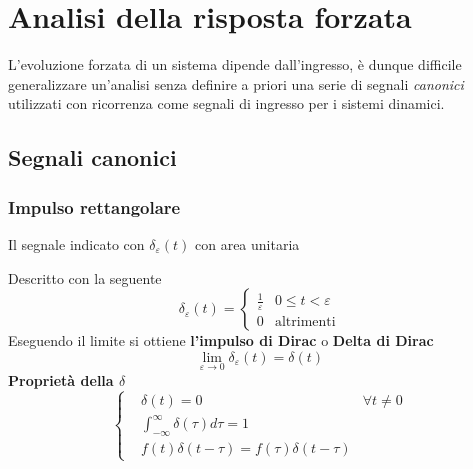 \newpage
\section{Analisi della risposta forzata}
L'evoluzione forzata di un sistema dipende dall'ingresso, è dunque difficile
generalizzare un'analisi senza definire a priori una serie di segnali
\textit{canonici} utilizzati con ricorrenza come segnali di ingresso per i
sistemi dinamici.

\subsection{Segnali canonici}
\label{sec:segnali_canonici}
\subsubsection{Impulso rettangolare}
Il segnale indicato con $\delta_\varepsilon(t)$ con area unitaria
\begin{figure}[h]
\centering
\end{figure}

Descritto con la seguente
$$
\delta_\varepsilon(t) =
\begin{cases}
\frac{1}{\varepsilon} & 0\leq t <\varepsilon \\
0 & \text{altrimenti}
\end{cases}
$$
Eseguendo il limite si ottiene \textbf{l'impulso di Dirac} o \textbf{Delta di
Dirac}
$$
\lim_{\varepsilon \to 0} \delta_\varepsilon(t) = \delta(t)
$$
\textbf{Proprietà della $\delta$}
$$\left\{
\begin{aligned}
&\delta(t)=0 & \forall t\neq 0 \\
&\int_{-\infty}^{\infty} \delta(\tau)d\tau = 1\\
&f(t)\delta(t-\tau) = f(\tau)\delta(t-\tau)
\end{aligned}\right.
$$

